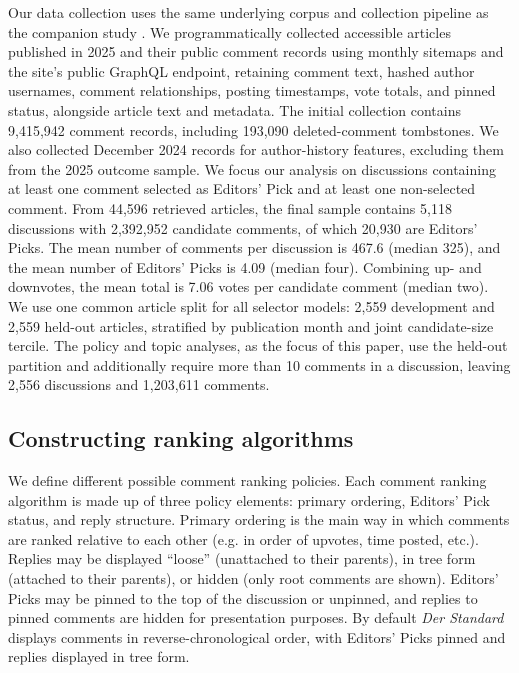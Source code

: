 Our data collection uses the same underlying corpus and collection pipeline as the companion study \citep{CommentGap1}. We programmatically collected accessible articles published in 2025 and their public comment records using monthly sitemaps and the site's public GraphQL endpoint, retaining comment text, hashed author usernames, comment relationships, posting timestamps, vote totals, and pinned status, alongside article text and metadata. The initial collection contains 9,415,942 comment records, including 193,090 deleted-comment tombstones. We also collected December 2024 records for author-history features, excluding them from the 2025 outcome sample. We focus our analysis on discussions containing at least one comment selected as Editors' Pick and at least one non-selected comment. From 44,596 retrieved articles, the final sample contains 5,118 discussions with 2,392,952 candidate comments, of which 20,930 are Editors' Picks. The mean number of comments per discussion is 467.6 (median 325), and the mean number of Editors' Picks is 4.09 (median four). Combining up- and downvotes, the mean total is 7.06 votes per candidate comment (median two). We use one common article split for all selector models: 2,559 development and 2,559 held-out articles, stratified by publication month and joint candidate-size tercile. The policy and topic analyses, as the focus of this paper, use the held-out partition and additionally require more than 10 comments in a discussion, leaving 2,556 discussions and 1,203,611 comments.

\subsection{Constructing ranking algorithms}
\label{sec:policies}
We define different possible comment ranking policies. Each comment ranking algorithm is made up of three policy elements: primary ordering, Editors' Pick status, and reply structure. Primary ordering is the main way in which comments are ranked relative to each other (e.g. in order of upvotes, time posted, etc.). Replies may be displayed ``loose'' (unattached to their parents), in tree form (attached to their parents), or hidden (only root comments are shown). Editors' Picks may be pinned to the top of the discussion or unpinned, and replies to pinned comments are hidden for presentation purposes. By default \textit{Der Standard} displays comments in reverse-chronological order, with Editors' Picks pinned and replies displayed in tree form.

